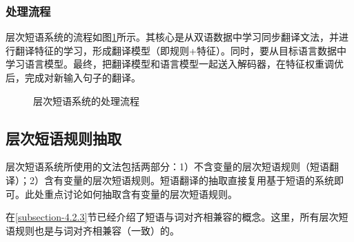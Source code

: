 
\subsubsection{处理流程}

\parinterval 层次短语系统的流程如图\ref{fig:4-33}所示。其核心是从双语数据中学习同步翻译文法，并进行翻译特征的学习，形成翻译模型（即规则+特征）。同时，要从目标语言数据中学习语言模型。最终，把翻译模型和语言模型一起送入解码器，在特征权重调优后，完成对新输入句子的翻译。

\begin{figure}[htp]
\centering

\caption{层次短语系统的处理流程}
\label{fig:4-33}
\end{figure}


\subsection{层次短语规则抽取}

\parinterval 层次短语系统所使用的文法包括两部分：1）不含变量的层次短语规则（短语翻译）；2）含有变量的层次短语规则。短语翻译的抽取直接复用基于短语的系统即可。此处重点讨论如何抽取含有变量的层次短语规则。

\parinterval 在\ref{subsection-4.2.3}节已经介绍了短语与词对齐相兼容的概念。这里，所有层次短语规则也是与词对齐相兼容（一致）的。

